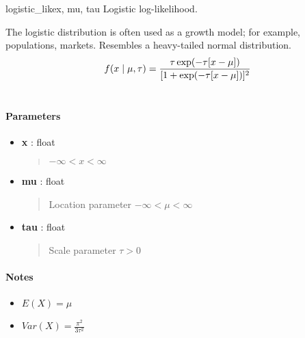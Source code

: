 \hypertarget{pymc.distributions.logistic_like}{}\begin{funcdesc}{logistic\_like}{x, mu, tau}
Logistic log-likelihood.

The logistic distribution is often used as a growth model; for example,
populations, markets. Resembles a heavy-tailed normal distribution.
\begin{gather}
\begin{split}f(x \mid \mu, \tau) = \frac{\tau \exp(-\tau[x-\mu])}{[1 + \exp(-\tau[x-\mu])]^2}\end{split}\notag\\\begin{split}\end{split}\notag
\end{gather}\paragraph{Parameters}\begin{itemize}

\item[] \textbf{x} : float
\begin{quote}

$-\infty < x < \infty$
\end{quote}

\item[] \textbf{mu} : float
\begin{quote}

Location parameter $-\infty < \mu < \infty$
\end{quote}

\item[] \textbf{tau} : float
\begin{quote}

Scale parameter $\tau > 0$
\end{quote}
\end{itemize}
\paragraph{Notes}
\begin{itemize}
\item {} 
$E(X) = \mu$

\item {} 
$Var(X) = \frac{\pi^2}{3\tau^2}$

\end{itemize}
\end{funcdesc}


